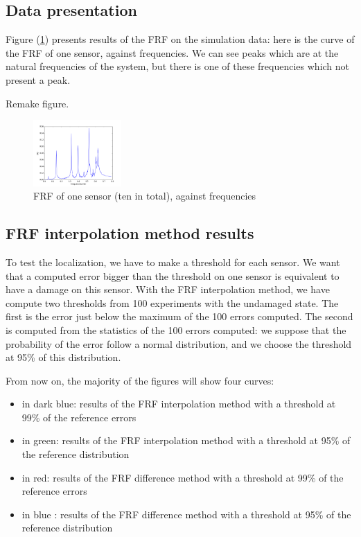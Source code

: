 \documentclass[journal]{IEEEtran}
\begin{document}
\subsection{Data presentation}

Figure (\ref{frf_freq}) presents results of the FRF on the simulation data: here is the curve of the FRF of one sensor, against frequencies. We can see peaks which are at the natural frequencies of the system, but there is one of these frequencies which not present a peak.

Remake figure.

\begin{figure}[h!]
  \centering
  \includegraphics[width=0.3\textwidth]{images/persensor1.png}
  \caption{FRF of one sensor (ten in total), against frequencies}
  \label{frf_freq}
\end{figure}



\subsection{FRF interpolation method results}

To test the localization, we have to make a threshold for each sensor. We want that a computed error bigger than the threshold on one sensor is equivalent to have a damage on this sensor. With the FRF interpolation method, we have compute two thresholds from 100 experiments with the undamaged state. The first is the error just below the maximum of the 100 errors computed. The second is computed from the statistics of the 100 errors computed: we suppose that the probability of the error follow a normal distribution, and we choose the threshold at 95\% of this distribution.

From now on, the majority of the figures will show four curves:
\begin{itemize}
\item in dark blue: results of the FRF interpolation method with a threshold at 99\% of the reference errors
\item in green: results of the FRF interpolation method with a threshold at 95\% of the reference distribution
\item in red: results of the FRF difference method with a threshold at 99\% of the reference errors
\item in blue : results of the FRF difference method with a threshold at 95\% of the reference distribution
\end{itemize}
\end{document}
